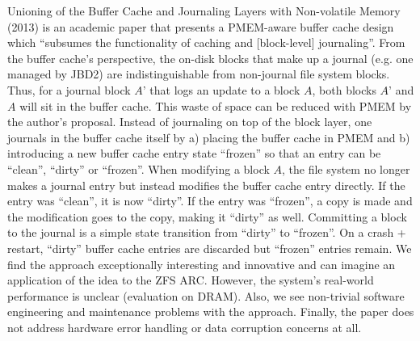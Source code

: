 \documentclass[12pt,a4paper,twoside,draft]{book}
\begin{document}
Unioning of the Buffer Cache and Journaling Layers with Non-volatile Memory (2013) is an academic paper that presents a PMEM-aware buffer cache design which
  “subsumes the functionality of caching and [block-level] journaling”.
From the buffer cache’s perspective, the on-disk blocks that make up a journal (e.g. one managed by JBD2) are indistinguishable from non-journal file system blocks.
Thus, for a journal block $A’$ that logs an update to a block $A$, both blocks $A’$ and $A$ will sit in the buffer cache.
This waste of space can be reduced with PMEM by the author’s proposal.
Instead of journaling on top of the block layer, one journals in the buffer cache itself by a) placing the buffer cache in PMEM and b) introducing a new buffer cache entry state “frozen” so that an entry can be “clean”, “dirty” or “frozen”.
When modifying a block $A$, the file system no longer makes a journal entry but instead modifies the buffer cache entry directly.
If the entry was “clean”, it is now “dirty”. If the entry was “frozen”, a copy is made and the modification goes to the copy, making it “dirty” as well.
Committing a block to the journal is a simple state transition from “dirty” to “frozen”. On a crash + restart, “dirty” buffer cache entries are discarded but “frozen” entries remain.
We find the approach exceptionally interesting and innovative and can imagine an application of the idea to the ZFS ARC.
However, the system’s real-world performance is unclear (evaluation on DRAM).
Also, we see non-trivial software engineering and maintenance problems with the approach.
Finally, the paper does not address hardware error handling or data corruption concerns at all.
\end{document}
